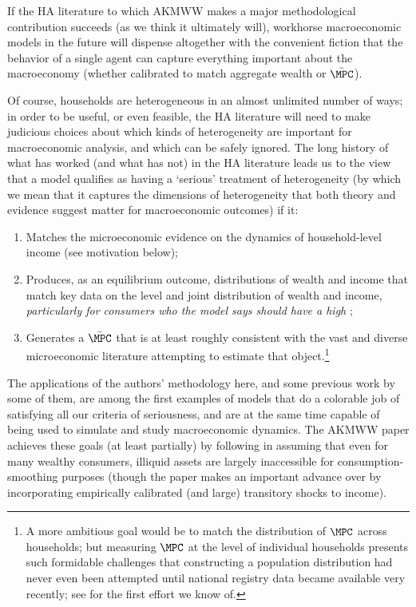\documentclass[titlepage]{econtex}
\begin{document}

If the HA literature to which AKMWW makes a major methodological contribution succeeds (as we think it ultimately will), workhorse macroeconomic models in the future will dispense altogether with the convenient fiction that the behavior of a single agent can capture everything important about the macroeconomy (whether calibrated to match aggregate wealth or $\bar{\MPC}$).

Of course, households are heterogeneous in an almost unlimited number of ways; in order to be useful, or even feasible, the HA literature will need to make judicious choices about which kinds of heterogeneity are important for macroeconomic analysis, and which can be safely ignored.  The long history of what has worked (and what has not) in the HA literature leads us to the view that a model qualifies as having a `serious' treatment of heterogeneity (by which we mean that it captures the dimensions of heterogeneity that both theory and evidence suggest matter for macroeconomic outcomes) if it:
\begin{enumerate}
\item Matches the microeconomic evidence on the dynamics of household-level income (see motivation below);
\item Produces, as an equilibrium outcome, distributions of wealth and income that match key data on the level and joint distribution of wealth and income, {\it particularly for consumers who the model says should have a high {\MPC}};
\item Generates a $\bar{\MPC}$ that is at least roughly consistent with the vast and diverse microeconomic literature attempting to estimate that object.\footnote{A more ambitious goal would be to match the distribution of $\MPC$ across households; but measuring $\MPC$ at the level of individual households presents such formidable challenges that constructing a population distribution had never even been attempted until national registry data became available very recently; see \cite{fhnMPC} for the first effort we know of.}
\end{enumerate}

The applications of the authors' methodology here, and some previous work by some of them, are among the first examples of models that do a colorable job of satisfying all our criteria of seriousness, and are at the same time capable of being used to simulate and study macroeconomic dynamics.
  The AKMWW paper achieves these goals (at least partially) by following \cite{kvStim} in assuming that even for many wealthy consumers, illiquid assets are largely inaccessible for consumption-smoothing purposes (though the paper makes an important advance over \cite{kvStim} by incorporating empirically calibrated (and large) transitory shocks to income).  
\end{document}
